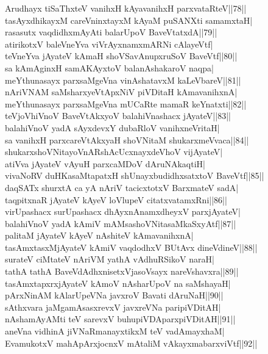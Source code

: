 \documentclass{article}
\begin{document}
Arudhayx tiSaThxteV vanihxH kAyavanihxH parxvataRteV||78||\\
tasAyxdhikayxM careVninxtayxM kAyaM puSANXti samamxtaH|\\
rasasutx vaqdidhxmAyAti balarUpoV BaveVtatxdA||79||\\
atirikotxV baleVneYva viVrAyxnamxmARNi cAlayeVtf|\\
teVneYva jAyateV kAmaH shoVSavAnupxruSoV BaveVtf||80||\\
sa kAmAginxH samAKAyxtoV balanAshakaroV naqpa|\\
meYthunasayx parxsaMgeVna vinAshatavxM kaLeVbareV||81||\\
nAriVNAM saMsharxyeVtApxNiV piVDitaH kAmavanihxnA|\\
meYthunasayx parxsaMgeVna mUCaRte mamaR keYnatxti||82||\\
teVjoVhiVnoV BaveVtAkxyoV balahiVnashacx jAyateV||83||\\
balahiVnoV yadA sAyxdevxY dubaRloV vanihxneVritaH|\\
sa vanihxH parxcareVtAkxyaH shoVNitaM shukarxmeVvaca||84||\\
shukarxshoVNitayoVnARshAcUcxnayxdeVhoV vijAyateV|\\
atiVva jAyateV vAyuH parxcaMDoV dAruNAkaqtiH|\\
vivaNoRV duHKasaMtapatxH shUnayxbudidhxsatxtoV BaveVtf||85||\\
daqSATx shurxtA ca yA nAriV tacicxtotxV BarxmateV sadA|\\
taqpitxnaR jAyateV kAyeV loVlupeV citatxvatamxRni||86||\\
virUpashacx surUpashacx dhAyxnAnamxdheyxV parxjAyateV|\\
balahiVnoV yadA kAmiV mAMsashoVNitasaMkaSxyAtf||87||\\
palitaM jAyateV kAyeV nAshiteV kAmavanihxnA|\\
tasAmxtasxMjAyateV kAmiV vaqdodhxV BUtAvx dineVdineV||88||\\
surateV ciMtateV nAriVM yathA vAdhuRSikoV naraH|\\
tathA tathA BaveVdAdhxnisetxVjasoVsayx nareVshavxra||89||\\
tasAmxtapxrxjAyateV kAmoV nAsharUpoV na saMshayaH|\\
pArxNinAM kAlarUpeVNa javxroV Bavati dAruNaH||90||\\
sAthxvara jaMgamAsasxrevxV javxreVNa paripiVDitAH|\\
nAshamAyAMti teV sarevxV buhupiVDAparxpiVDitAH||91||\\
aneVna vidhinA jiVNaRmanayxtikxM teV vadAmayxhaM|\\
EvamukotxV mahApArxjocnxV mAtaliM vAkayxmabarxviVtf||92||
\end{document}
